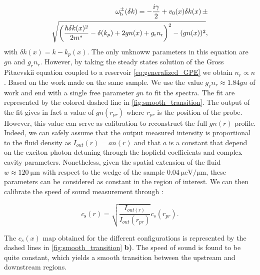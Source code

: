 \begin{equation}
    \label{eq:lfbogo}
    \begin{split}
        \omega_{\mathrm{b}}^{\pm}(\delta k)= -\frac{i\gamma}{2}+ v_0(x) \delta k(x)\,\pm \\\sqrt{\left(\frac{\hbar \delta k(x)^2}{2m^*}-\delta(k_p) +2gn(x) +g_\mathrm{r} n_\mathrm{r}    \right)^2-(gn(x))^2},
    \end{split}
\end{equation}
with $\delta k(x)=k-k_p(x)$. The only unknoww parameters in this equation are $gn$ and $g_rn_r$. However, by taking the steady states solution of the Gross Pitaevskii equation coupled to a reservoir \autoref{eq:generalized_GPE} we obtain $n_r\propto n$.
Based on the work \cite{claude_phd,claude_high-resolution_2022} made on the same sample. We use the value $g_rn_r\approx 1.84gn$ of work \cite{claude_phd} and end 
with a single free parameter $gn$ to fit the spectra. The fit are represented by the colored dashed line in \autoref{fig:smooth_transition}. The output of the fit gives in fact a value of $gn(r_{pr})$ where $r_{pr}$ is the position of the probe. However, this value can serve 
as calibration to reconstruct the full $gn(r)$ profile. Indeed, we can safely assume that the output measured intensity is proportional to the 
fluid density as $I_{out}(r)=a n(r)$ and that $a$ is a constant that depend on the exciton photon detuning through the hopfield coefficients and complex 
cavity parameters. Nonetheless, given the spatial extension of the fluid $w\approx \SI{120}{\micro \meter}$ with respect to the wedge of the sample $\SI{0.04}{\micro \electronvolt \per \micro \meter}$, these parameters can be considered as constant in the region of interest.
We can then calibrate the speed of sound measurement through :

\begin{equation}
    \label{eq:speed_of_sound_calib}
    c_\mathrm{s}(r)=\sqrt{\frac{I_{out(r)}}{I_{out}(r_{pr})}}c_s(r_{pr}).
\end{equation}

The $c_s(x)$ map obtained for the different configurations is represented by the dashed lines in \autoref{fig:smooth_transition} \textbf{b)}. The speed of sound is found to be quite constant, which yields a smooth transition between the upstream and downstream regions. 

